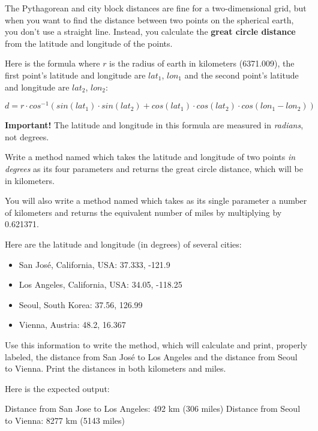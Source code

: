 \begin{exercise}
The Pythagorean and city block distances are fine for a two-dimensional grid, but when you want to find the distance between two points on the spherical earth, you don't use a straight line. Instead, you calculate the {\bf great circle distance} from the latitude and longitude of the points.

Here is the formula where $r$ is the radius of earth in kilometers (6371.009), the first point's latitude and longitude are $lat_1$, $lon_1$ and the second point's latitude and longitude are  $lat_2$, $lon_2$:

\begin{equation*}
d = r\cdot cos^{-1}(sin(lat_1)\cdot sin(lat_2) + cos(lat_1)\cdot cos(lat_2)\cdot cos(lon_1 - lon_2))
\end{equation*}

{\bf Important!} The latitude and longitude in this formula are measured in {\em radians}, not degrees.

Write a method named  which takes the latitude and longitude of two points {\em in degrees} as its four parameters and returns the great circle distance, which will be in kilometers.

You will also write a method named  which takes as its single parameter a number of kilometers and returns the equivalent number of miles by multiplying by 0.621371.

Here are the latitude and longitude (in degrees) of several cities:
\begin{itemize}
\item San Jos\'e, California, USA: 37.333, -121.9
\item Los Angeles, California, USA: 34.05, -118.25
\item Seoul, South Korea: 37.56, 126.99
\item Vienna, Austria: 48.2, 16.367
\end{itemize}

Use this information to write the  method, which will calculate and print, properly labeled, the distance from San Jos\'e to Los Angeles and the distance from Seoul to Vienna. Print the distances in both kilometers and miles.

Here is the expected output:

\begin{stdout}
Distance from San Jose to Los Angeles: 492 km (306 miles)
Distance from Seoul to Vienna: 8277 km (5143 miles)
\end{stdout}

\end{exercise}

